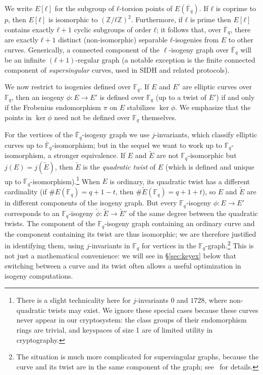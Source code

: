 \documentclass{llncs}
\newcommand{\F}{\mathbb{F}}
\newcommand{\Fbar}{\overline{\mathbb{F}}}
\begin{document}
We write $E[ℓ]$ for the subgroup of $ℓ$-torsion points of
$E(\Fbar_q)$.  If $ℓ$ is coprime to $p$, then $E[ℓ]$ is isomorphic to
$(ℤ/ℓℤ)^2$.  Furthermore, if $ℓ$ is prime then $E[ℓ]$ contains exactly
$ℓ+1$ cyclic subgroups of order $ℓ$; it follows that, over $\Fbar_q$,
there are exactly $ℓ+1$ distinct (non-isomorphic) separable $ℓ$-isogenies 
from $E$ to other curves.
Generically, a connected component of the $\ell$-isogeny graph 
over $\Fbar_q$ will be an infinite $(ℓ+1)$-regular
graph (a notable exception is the finite connected component of
\emph{supersingular} curves, used in SIDH and related protocols).

We now restrict to isogenies defined over $\F_q$.
If $E$ and $E'$ are elliptic curves over $\F_q$,
then an isogeny $ϕ:E→E'$ is defined over $\F_q$
(up to a twist of $E'$)
if and only if the Frobenius endomorphism $\pi$ on $E$ stabilizes $\ker ϕ$.
We emphasize that the points in $\ker\phi$ need not
be defined over $\F_q$ themselves.

For the vertices of the $\Fbar_q$-isogeny graph
we use $j$-invariants,
which classify elliptic curves up to
$\Fbar_q$-isomorphism;
but in the sequel we want to work up to $\F_q$-isomorphism,
a stronger equivalence.
If $E$ and $\tilde{E}$ are not $\F_q$-isomorphic
but $j(E) = j(\tilde{E})$,
then $\tilde{E}$ is the \emph{quadratic twist} of $E$
(which is defined and unique up to $\F_q$-isomorphism).\footnote{%
    There is a slight technicality here for $j$-invariants $0$ and $1728$,
    where non-quadratic twists may exist.
    We ignore these special cases
    because these curves never appear in our cryptosystem:
    the class groups of their endomorphism rings are trivial,
    and keyspaces of size 1 are of limited utility in cryptography.
}
When $E$ is ordinary,
its quadratic twist has a different cardinality
(if $\#E(\F_q) = q + 1 - t$, then $\#\tilde{E}(\F_q) = q + 1 + t$),
so $E$ and $\tilde{E}$ are in different components of the isogeny graph.
But every $\F_q$-isogeny $\phi: E \to E'$ 
corresponds to an $\F_q$-isogeny $\tilde{\phi}: \tilde{E} \to \tilde{E}'$
of the same degree between the quadratic twists.
The component of the $\F_q$-isogeny graph containing an ordinary curve 
and the component containing its twist are thus isomorphic;
we are therefore justified in identifying them,
using $j$-invariants in $\F_q$ for vertices in the
$\F_q$-graph.\footnote{%
    The situation is much more complicated for supersingular graphs,
    because the curve and its twist are in the same component
    of the graph; see~\cite[\S2]{DelfsG16} for details.
}
This is not just a mathematical convenience:
we will see in \S\ref{sec:keyex} below 
that switching between a curve and its twist
often allows a useful optimization in isogeny computations.
\end{document}
